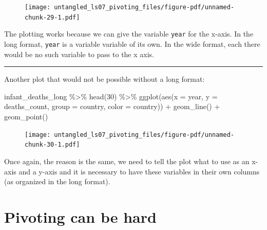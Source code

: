 \documentclass[
  letterpaper,
  DIV=11,
  numbers=noendperiod]{scrreprt}
\newenvironment{Shaded}{\begin{snugshade}}{\end{snugshade}}
\newcommand{\AttributeTok}[1]{\textcolor[rgb]{0.40,0.45,0.13}{#1}}
\newcommand{\DecValTok}[1]{\textcolor[rgb]{0.68,0.00,0.00}{#1}}
\newcommand{\FunctionTok}[1]{\textcolor[rgb]{0.28,0.35,0.67}{#1}}
\newcommand{\NormalTok}[1]{\textcolor[rgb]{0.00,0.23,0.31}{#1}}
\newcommand{\SpecialCharTok}[1]{\textcolor[rgb]{0.37,0.37,0.37}{#1}}
\begin{document}
\begin{figure}[H]

{\centering \texttt{[image: untangled\_ls07\_pivoting\_files/figure-pdf/unnamed-chunk-29-1.pdf]}

}

\end{figure}

The plotting works because we can give the variable \texttt{year} for
the x-axis. In the long format, \texttt{year} is a variable variable of
its own. In the wide format, each there would be no such variable to
pass to the x axis.

\begin{center}\rule{0.5\linewidth}{0.5pt}\end{center}

Another plot that would not be possible without a long format:

\begin{Shaded}
\begin{Highlighting}[]
\NormalTok{infant\_deaths\_long }\SpecialCharTok{\%\textgreater{}\%} 
  \FunctionTok{head}\NormalTok{(}\DecValTok{30}\NormalTok{) }\SpecialCharTok{\%\textgreater{}\%} 
  \FunctionTok{ggplot}\NormalTok{(}\FunctionTok{aes}\NormalTok{(}\AttributeTok{x =}\NormalTok{ year, }\AttributeTok{y =}\NormalTok{ deaths\_count, }\AttributeTok{group =}\NormalTok{ country, }\AttributeTok{color =}\NormalTok{ country)) }\SpecialCharTok{+} 
  \FunctionTok{geom\_line}\NormalTok{() }\SpecialCharTok{+} 
  \FunctionTok{geom\_point}\NormalTok{()}
\end{Highlighting}
\end{Shaded}

\begin{figure}[H]

{\centering \texttt{[image: untangled\_ls07\_pivoting\_files/figure-pdf/unnamed-chunk-30-1.pdf]}

}

\end{figure}

Once again, the reason is the same, we need to tell the plot what to use
as an x-axis and a y-axis and it is necessary to have these variables in
their own columns (as organized in the long format).

\hypertarget{pivoting-can-be-hard}{%
\section{Pivoting can be hard}\label{pivoting-can-be-hard}}
\end{document}

